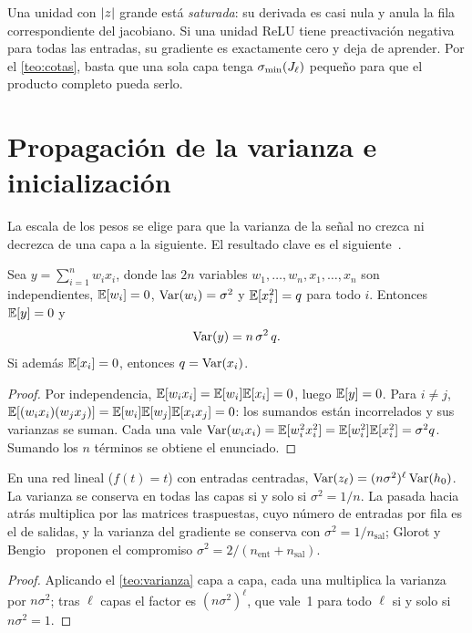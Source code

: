 Una unidad con $\lvert z\rvert$ grande está \emph{saturada}: su derivada es casi nula y anula la fila correspondiente del jacobiano. Si una unidad ReLU tiene preactivación negativa para todas las entradas, su gradiente es exactamente cero y deja de aprender. Por el \cref{teo:cotas}, basta que una sola capa tenga $\sigma_{\min}(J_\ell)$ pequeño para que el producto completo pueda serlo.

\section{Propagación de la varianza e inicialización}

La escala de los pesos se elige para que la varianza de la señal no crezca ni decrezca de una capa a la siguiente. El resultado clave es el siguiente~\cite[§5.4.2]{d2l}.

\begin{teorema}\label{teo:varianza}
Sea $y=\sum_{i=1}^{n}w_ix_i$, donde las $2n$ variables $w_1,\dots,w_n,x_1,\dots,x_n$ son independientes, $\mathbb{E}[w_i]=0$, $\operatorname{Var}(w_i)=\sigma^{2}$ y $\mathbb{E}[x_i^{2}]=q$ para todo $i$. Entonces $\mathbb{E}[y]=0$ y
\[
\operatorname{Var}(y)=n\,\sigma^{2}\,q .
\]
Si además $\mathbb{E}[x_i]=0$, entonces $q=\operatorname{Var}(x_i)$.
\end{teorema}

\begin{proof}
Por independencia, $\mathbb{E}[w_ix_i]=\mathbb{E}[w_i]\mathbb{E}[x_i]=0$, luego $\mathbb{E}[y]=0$. Para $i\ne j$, $\mathbb{E}[(w_ix_i)(w_jx_j)]=\mathbb{E}[w_i]\mathbb{E}[w_j]\mathbb{E}[x_ix_j]=0$: los sumandos están incorrelados y sus varianzas se suman. Cada una vale $\operatorname{Var}(w_ix_i)=\mathbb{E}[w_i^{2}x_i^{2}]=\mathbb{E}[w_i^{2}]\mathbb{E}[x_i^{2}]=\sigma^{2}q$. Sumando los $n$ términos se obtiene el enunciado.
\end{proof}

\begin{corolario}\label{cor:xavier}
En una red lineal ($f(t)=t$) con entradas centradas, $\operatorname{Var}(z_\ell)=(n\sigma^{2})^{\ell}\operatorname{Var}(h_0)$. La varianza se conserva en todas las capas si y solo si $\sigma^{2}=1/n$. La pasada hacia atrás multiplica por las matrices traspuestas, cuyo número de entradas por fila es el de salidas, y la varianza del gradiente se conserva con $\sigma^{2}=1/n_{\text{sal}}$; Glorot y Bengio~\cite{glorot} proponen el compromiso $\sigma^{2}=2/(n_{\text{ent}}+n_{\text{sal}})$.
\end{corolario}

\begin{proof}
Aplicando el \cref{teo:varianza} capa a capa, cada una multiplica la varianza por $n\sigma^{2}$; tras $\ell$ capas el factor es $(n\sigma^{2})^{\ell}$, que vale~1 para todo $\ell$ si y solo si $n\sigma^{2}=1$.
\end{proof}

